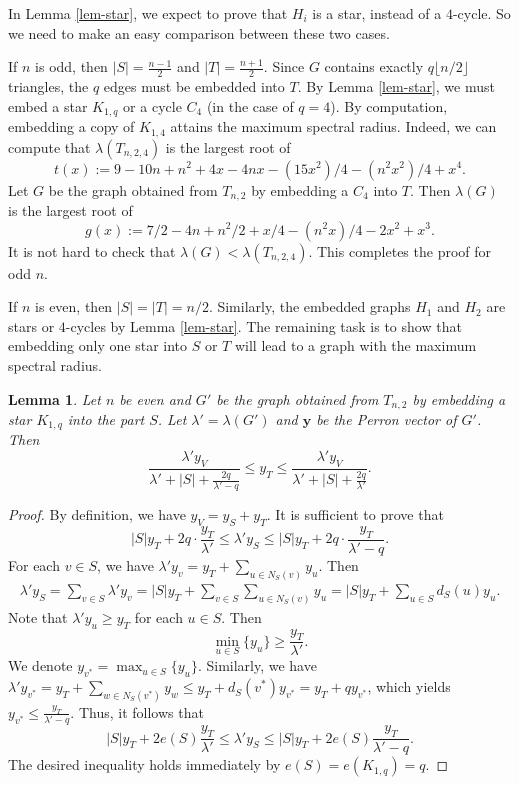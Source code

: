 \documentclass[11pt]{article}
\newtheorem{lemma}[theorem]{Lemma}
\begin{document}
In Lemma \ref{lem-star}, we expect to prove that 
$H_i$ is a star, instead of a $4$-cycle. 
So we need to make 
an easy comparison between these two cases. 

\medskip 
If $n$ is odd, then $|S|= \frac{n-1}{2}$ 
and $|T|= \frac{n+1}{2}$. 
Since $G$ contains exactly $q\lfloor {n}/{2}\rfloor$ triangles, 
 the $q$ edges must be embedded into $T$. By Lemma \ref{lem-star}, we must embed 
a star $K_{1,q}$ or a cycle $C_4$ (in the case of $q=4$).  
By computation, embedding a copy of $K_{1,4}$ attains the maximum spectral radius. 
Indeed, we can compute that $\lambda (T_{n,2,4}) $ 
is the largest root of 
\[  t(x):= 9 - 10 n + n^2 + 4 x - 4 n x - (15 x^2)/4 - (n^2 x^2)/4 + x^4.  \]
Let $G$ be the graph obtained from  $T_{n,2}$ 
by embedding a $C_4$ into $T$. Then $\lambda (G)$ is the largest root of 
\[ g(x):= 7/2 - 4 n + n^2/2 + x/4 - (n^2 x)/4 - 2 x^2 + x^3. \]
It is not hard to check that $\lambda (G)< \lambda (T_{n,2,4})$. 
This completes the proof for odd $n$. 


\medskip 
If $n$ is even, then $|S|= |T| = {n}/{2}$. 
Similarly, the embedded graphs $H_1$ and 
$H_2$ are stars or $4$-cycles by Lemma \ref{lem-star}. 
The remaining task is to show that 
embedding only one star into $S$ or $T$ 
will lead to a graph with the maximum spectral radius. 


\begin{lemma} \label{lem-x-S} 
Let $n$ be even and $G'$ be the graph obtained from $T_{n,2}$ by embedding a star $K_{1,q}$ into the part $S$.  
Let $\lambda ' = \lambda (G')$ and $\bm{y}$ be the Perron vector of $G'$. 
Then 
\[  \frac{\lambda' y_V}{\lambda' + |S| + \frac{2q}{\lambda' -q}} \le y_T \le  \frac{\lambda' y_V}{\lambda' + |S| + \frac{2q}{\lambda' }} . \]
\end{lemma}


\begin{proof}
By definition, we have $y_V= y_S + y_T$. It is sufficient to prove that 
\[  |S| y_T + 2q \cdot \frac{y_T}{\lambda'} \le 
 \lambda' y_S \le |S| y_T + 2q\cdot  \frac{y_T}{\lambda' -q}.  \]
 For each $v\in S$, we have 
 $\lambda' y_v = y_T + \sum_{u\in N_S(v)} y_u$. Then 
 \begin{eqnarray*}
 \lambda' y_S = \sum_{v\in S} \lambda' y_v 
 = |S| y_T + \sum_{v\in S} \sum_{u\in N_S(v)} y_u 
 = |S|y_T + \sum_{u\in S} d_S(u) y_u.
 \end{eqnarray*}
 Note that $\lambda' y_u \ge y_T$ for each $u\in S$. Then 
 \[  \min_{u\in S} \{ y_u \} \ge \frac{y_T}{\lambda'}. \]  
We denote $y_{v^*}=\max_{u\in S}\{ y_u \}$. 
Similarly, we have $\lambda ' y_{v^*} = 
y_T + \sum_{w\in N_S(v^*)} y_w \le y_T + d_S(v^*) y_{v^*} = 
y_T + qy_{v^*}$, 
which yields $y_{v^*}\le \frac{y_T}{\lambda' -q}$. 
Thus, it follows that 
\[  |S|y_T + 2e(S) \frac{y_T}{\lambda' }  \le 
\lambda' y_S \le |S|y_T + 2e(S) \frac{y_T}{\lambda' -q}.  \]
The desired inequality holds immediately 
by  $e(S)= e(K_{1,q}) = q$. 
\end{proof}
\end{document}
